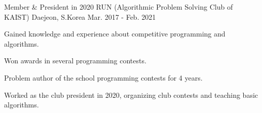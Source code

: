 

\begin{cventries}

  \cventry
    {Member \& President in 2020} %
    {RUN (Algorithmic Problem Solving Club of KAIST)} %
    {Daejeon, S.Korea} %
    {Mar. 2017 - Feb. 2021} %
    {
      \begin{cvitems} %
        \item {Gained knowledge and experience about competitive programming and algorithms.}
        \item {Won awards in several programming contests.}
        \item {Problem author of the school programming contests for 4 years.}
        \item {Worked as the club president in 2020, organizing club contests and teaching basic algorithms.}
      \end{cvitems}
    }

\end{cventries}
